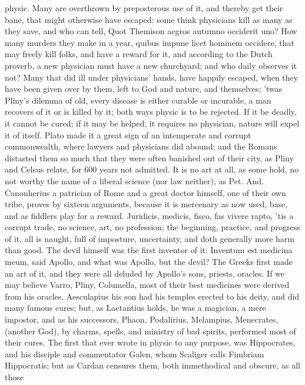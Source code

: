{physic. Many are overthrown by preposterous use of it, and thereby get
their bane, that might otherwise have escaped: some think
physicians kill as many as they save, and who can tell, Quot
Themison aegros autumno occiderit uno? How many murders they make in a
year, quibus impune licet hominem occidere, that may freely kill folks,
and have a reward for it, and according to the Dutch proverb, a new
physician must have a new churchyard; and who daily observes it not?
Many that did ill under physicians' hands, have happily escaped, when
they have been given over by them, left to God and nature, and
themselves; 'twas Pliny's dilemma of old, every disease is either
curable or incurable, a man recovers of it or is killed by it; both
ways physic is to be rejected. If it be deadly, it cannot be cured; if
it may be helped, it requires no physician, nature will expel it of
itself. Plato made it a great sign of an intemperate and corrupt
commonwealth, where lawyers and physicians did abound; and the Romans
distasted them so much that they were often banished out of their city,
as Pliny and Celsus relate, for 600 years not admitted. It is no art at
all, as some hold, no not worthy the name of a liberal science (nor law
neither), as Pet. And. Canonherius a patrician of Rome and a
great doctor himself, one of their own tribe, proves by sixteen
arguments, because it is mercenary as now used, base, and as fiddlers
play for a reward. Juridicis, medicis, fisco, fas vivere rapto, 'tis a
corrupt trade, no science, art, no profession; the beginning, practice,
and progress of it, all is naught, full of imposture, uncertainty, and
doth generally more harm than good. The devil himself was the first
inventor of it: Inventum est medicina meum, said Apollo, and what was
Apollo, but the devil? The Greeks first made an art of it, and they
were all deluded by Apollo's sons, priests, oracles. If we may believe
Varro, Pliny, Columella, most of their best medicines were derived from
his oracles. Aesculapius his son had his temples erected to his deity,
and did many famous cures; but, as Lactantius holds, he was a magician,
a mere impostor, and as his successors, Phaon, Podalirius, Melampius,
Menecrates, (another God), by charms, spells, and ministry of bad
spirits, performed most of their cures. The first that ever wrote in
physic to any purpose, was Hippocrates, and his disciple and
commentator Galen, whom Scaliger calls Fimbriam Hippocratis; but as
Cardan censures them, both immethodical and obscure, as all those
}
